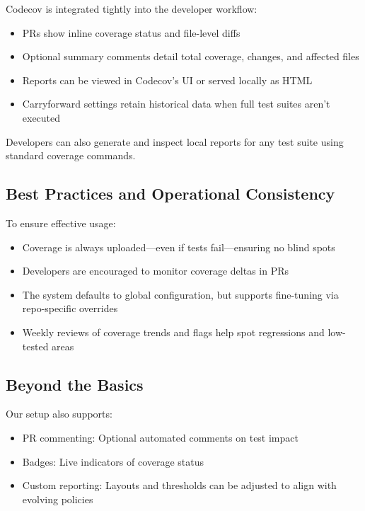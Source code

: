 \documentclass{article}
\begin{document}
Codecov is integrated tightly into the developer workflow:

\begin{itemize}

  \item PRs show inline coverage status and file-level diffs

  \item Optional summary comments detail total coverage, changes, and affected files

  \item Reports can be viewed in Codecov's UI or served locally as HTML

  \item Carryforward settings retain historical data when full test suites aren't
    executed
\end{itemize}

Developers can also generate and inspect local reports for any test suite using
standard coverage commands.

\subsection{Best Practices and Operational Consistency}
\label{best-practices-and-operational-consistency}

To ensure effective usage:

\begin{itemize}

  \item Coverage is always uploaded---even if tests fail---ensuring no blind spots

  \item Developers are encouraged to monitor coverage deltas in PRs

  \item The system defaults to global configuration, but supports fine-tuning
    via repo-specific overrides

  \item Weekly reviews of coverage trends and flags help spot regressions and low-tested
    areas
\end{itemize}

\subsection{Beyond the Basics}
\label{beyond-the-basics}

Our setup also supports:

\begin{itemize}

  \item PR commenting: Optional automated comments on test impact

  \item Badges: Live indicators of coverage status

  \item Custom reporting: Layouts and thresholds can be adjusted to align with
    evolving policies
\end{itemize}
\end{document}
